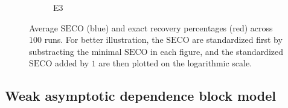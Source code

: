 \documentclass[11pt]{article}
\newcommand{\SECO}{\mathrm{SECO}}
\begin{document}
\begin{figure}[!htp]
\begin{subfigure}{.33\textwidth}
                  \caption{E3}
                  \label{fig:sfig_cv3}
                \end{subfigure}%
                \hspace{\fill}
    	\caption{Average $\SECO$ (blue) and exact recovery percentages (red) across $100$ runs. For better illustration, the $\SECO$ are standardized first by substracting the minimal $\SECO$ in each figure, and the standardized $\SECO$ added by $1$ are then plotted on the logarithmic scale.}
    	\label{fig:cv}
	\end{figure}
	 
	
		\subsection{Weak asymptotic dependence block model}
		
\end{document}
